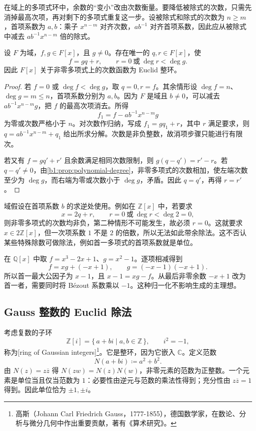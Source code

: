 \ProseParagraphBreak
在域上的多项式环中，余数的“变小”改由次数衡量。要降低被除式的次数，只需先消掉最高次项，再对剩下的多项式重复这一步。设被除式和除式的次数为 \(n\geq m\)，首项系数为 \(a,b\)：乘子 \(x^{n-m}\) 对齐次数，\(ab^{-1}\) 对齐首项系数，因此应从被除式中减去 \(ab^{-1}x^{n-m}\) 倍的除式。

\begin{proposition}[多项式带余除法]\label{b1:prop:field-poly-division}
	设 \(F\) 为域，\(f,g\in F[x]\)，且 \(g\ne0\)。存在唯一的 \(q,r\in F[x]\)，使
	\[
		f=gq+r,\qquad r=0\ \text{或}\ \deg r<\deg g.
	\]
	因此 \(F[x]\) 关于非零多项式上的次数函数为 Euclid 整环。
\end{proposition}
\begin{proof}
	若 \(f=0\) 或 \(\deg f<\deg g\)，取 \(q=0,r=f\)。其余情形设 \(\deg f=n\)、\(\deg g=m\leq n\)，首项系数分别为 \(a,b\)。因为 \(F\) 是域且 \(b\ne0\)，可以减去 \(ab^{-1}x^{n-m}g\)，把 \(f\) 的最高次项消去。所得
	\[
		f_1=f-ab^{-1}x^{n-m}g
	\]
	为零或次数严格小于 \(n\)。对次数作归纳，写成 \(f_1=gq_1+r\)，其中 \(r\) 满足要求，则 \(q=ab^{-1}x^{n-m}+q_1\) 给出所求分解。次数是非负整数，故消项步骤只能进行有限次。

	若又有 \(f=gq'+r'\) 且余数满足相同次数限制，则 \(g(q-q')=r'-r\)。若 \(q-q'\ne0\)，由\cref{b1:prop:polynomial-degree}，非零多项式的次数相加，使左端次数至少为 \(\deg g\)，而右端为零或次数小于 \(\deg g\)，矛盾。因此 \(q=q'\)，再得 \(r=r'\)。
\end{proof}

域假设在首项系数 \(b\) 的求逆处使用。例如在 \(\mathbb Z[x]\) 中，若要求
\[
	x=2q+r,\qquad r=0\ \text{或}\ \deg r<\deg2=0,
\]
则非零多项式的次数均非负，第二种情形不可能发生，故必须 \(r=0\)。这就要求 \(x\in2\mathbb Z[x]\)，但一次项系数 \(1\) 不是 \(2\) 的倍数，所以无法如此带余除法。这不否认某些特殊除数可做除法，例如首一多项式的首项系数就是单位。

\ProseParagraphBreak
在 \(\mathbb Q[x]\) 中取 \(f=x^3-2x+1\)、\(g=x^2-1\)。逐项相减得到
\[
	f=xg+(-x+1),\qquad g=(-x-1)(-x+1).
\]
所以首一最大公因子为 \(x-1\)，且 \(x-1=xg-f\)。从最后非零余数 \(-x+1\) 改为首一者，需要同时将 Bézout 系数乘以 \(-1\)。这种归一化不影响生成的主理想。

\subsection{Gauss 整数的 Euclid 除法}
\label{b1:subsec:1102:03}

考虑复数的子环
\[
	\mathbb Z[i]=\{\,a+bi\mid a,b\in\mathbb Z\,\},\qquad i^2=-1,
\]
称为[ring of Gaussian integers]\footnote{高斯（Johann Carl Friedrich Gauss，1777-1855），德国数学家，在数论、分析与微分几何中作出重要贡献，著有《算术研究》。}。它是整环，因为它嵌入 \(\mathbb C\)。定义范数
\[
	N(a+bi)\coloneqq a^2+b^2.
\]
由 \(N(z)=z\overline z\) 得 \(N(zw)=N(z)N(w)\)，非零元素的范数为正整数。一个元素是单位当且仅当范数为 \(1\)：必要性由逆元与范数的乘法性得到；充分性由 \(z\overline z=1\) 得到。因此单位恰为 \(\pm1,\pm i\)。

